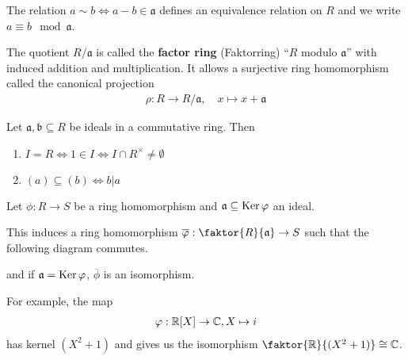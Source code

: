 \begin{thm}[]
The relation $a \sim b \iff a-b \in \mathfrak{a}$ defines an equivalence relation on $R$ and we write $a \equiv b \mod \mathfrak{a}$.

The quotient $R/\mathfrak{a}$ 
is called the \textbf{factor ring} (Faktorring) ``$R$ modulo $\mathfrak{a}$'' with induced addition and multiplication.
It allows a surjective ring homomorphism called the canonical projection
\begin{align*}
  \rho: R \to R / \mathfrak{a}, \quad x \mapsto x + \mathfrak{a}
\end{align*}
\end{thm}

\begin{lem}
Let $\mathfrak{a},\mathfrak{b} \subseteq R$ be ideals in a commutative ring. Then
\begin{enumerate}
  \item $I = R \iff 1 \in I \iff I \cap R^{\times} \neq \emptyset$
  \item $(a) \subseteq (b) \iff b | a$
\end{enumerate}
\end{lem}


\begin{prop}
  Let $\phi: R \to S$ be a ring homomorphism and $\mathfrak{a} \subseteq \operatorname{Ker} \varphi$ an ideal.

  This induces a ring homomorphism
  $\overline{\phi}: \faktor{R}{\mathfrak{a}} \to  S$
  such that the following diagram commutes.
  \begin{center}
  \end{center}
  and if $\mathfrak{a} = \operatorname{Ker} \varphi$, $\overline{\phi}$ is an isomorphism.
\end{prop}
For example, the map
\begin{align*}
  \varphi: \mathbb{R}[X] \to \mathbb{C}, X \mapsto  i
\end{align*}
has kernel $(X^{2} + 1)$ and gives us the isomorphism $\faktor{\R}{(X^{2}+1)} \iso \C$.


